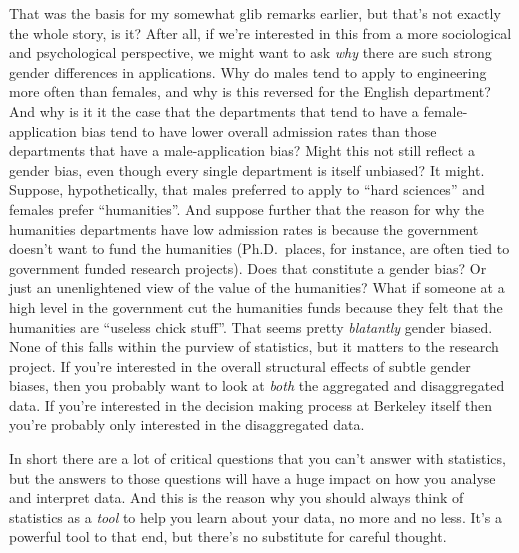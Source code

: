 \documentclass[]{book}
\begin{document}
That was the basis for my somewhat glib remarks earlier, but that's not exactly the whole story, is it? After all, if we're interested in this from a more sociological and psychological perspective, we might want to ask \emph{why} there are such strong gender differences in applications. Why do males tend to apply to engineering more often than females, and why is this reversed for the English department? And why is it it the case that the departments that tend to have a female-application bias tend to have lower overall admission rates than those departments that have a male-application bias? Might this not still reflect a gender bias, even though every single department is itself unbiased? It might. Suppose, hypothetically, that males preferred to apply to ``hard sciences'' and females prefer ``humanities''. And suppose further that the reason for why the humanities departments have low admission rates is because the government doesn't want to fund the humanities (Ph.D.~places, for instance, are often tied to government funded research projects). Does that constitute a gender bias? Or just an unenlightened view of the value of the humanities? What if someone at a high level in the government cut the humanities funds because they felt that the humanities are ``useless chick stuff''. That seems pretty \emph{blatantly} gender biased. None of this falls within the purview of statistics, but it matters to the research project. If you're interested in the overall structural effects of subtle gender biases, then you probably want to look at \emph{both} the aggregated and disaggregated data. If you're interested in the decision making process at Berkeley itself then you're probably only interested in the disaggregated data.

In short there are a lot of critical questions that you can't answer with statistics, but the answers to those questions will have a huge impact on how you analyse and interpret data. And this is the reason why you should always think of statistics as a \emph{tool} to help you learn about your data, no more and no less. It's a powerful tool to that end, but there's no substitute for careful thought.
\end{document}
